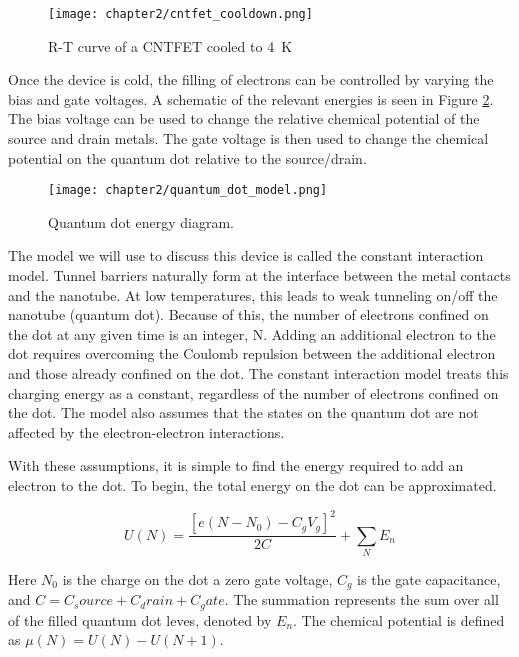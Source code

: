 \begin{figure}
    \centering
    \texttt{[image: chapter2/cntfet\_cooldown.png]}
    \caption{R-T curve of a CNTFET cooled to \SI{4}{\kelvin}}
    \label{fig:CNT_RT}
\end{figure}

Once the device is cold, the filling of electrons can be controlled by varying the bias and gate voltages. A schematic of the relevant energies is seen in Figure \ref{fig:QD_model}. The bias voltage can be used to change the relative chemical potential of the source and drain metals. The gate voltage is then used to change the chemical potential on the quantum dot relative to the source/drain.

\begin{figure}
    \centering
    \texttt{[image: chapter2/quantum\_dot\_model.png]}
    \caption{Quantum dot energy diagram.}
    \label{fig:QD_model}
\end{figure}

The model we will use to discuss this device is called the constant interaction model. Tunnel barriers naturally form at the interface between the metal contacts and the nanotube. At low temperatures, this leads to weak tunneling on/off the nanotube (quantum dot). Because of this, the number of electrons confined on the dot at any given time is an integer, N. Adding an additional electron to the dot requires overcoming the Coulomb repulsion between the additional electron and those already confined on the dot. The constant interaction model treats this charging energy as a constant, regardless of the number of electrons confined on the dot. The model also assumes that the states on the quantum dot are not affected by the electron-electron interactions.

With these assumptions, it is simple to find the energy required to add an electron to the dot. To begin, the total energy on the dot can be approximated.

\begin{equation}
    U(N) = \frac{[e(N-N_0) - C_gV_g]^2}{2C} + \sum_{N}^{} E_n
\end{equation}

Here $N_0$ is the charge on the dot a zero gate voltage, $C_g$ is the gate capacitance, and $C = C_source + C_drain + C_gate$. The summation represents the sum over all of the filled quantum dot leves, denoted by $E_n$. The chemical potential is defined as $\mu(N) = U(N) - U(N+1)$. 

